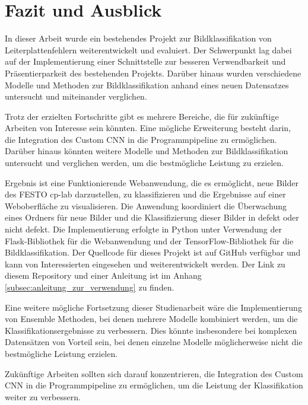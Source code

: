 
\chapter{Fazit und Ausblick} \label{chap:fazit_und_ausblick}

In dieser Arbeit wurde ein bestehendes Projekt zur Bildklassifikation von Leiterplattenfehlern weiterentwickelt und evaluiert. Der Schwerpunkt lag dabei auf der Implementierung einer Schnittstelle zur besseren Verwendbarkeit und Präsentierparkeit des bestehenden Projekts. Darüber hinaus wurden verschiedene Modelle und Methoden zur Bildklassifikation anhand eines neuen Datensatzes untersucht und miteinander verglichen.

Trotz der erzielten Fortschritte gibt es mehrere Bereiche, die für zukünftige Arbeiten von Interesse sein könnten. Eine mögliche Erweiterung besteht darin, die Integration des Custom CNN in die Programmpipeline zu ermöglichen. Darüber hinaus könnten weitere Modelle und Methoden zur Bildklassifikation untersucht und verglichen werden, um die bestmögliche Leistung zu erzielen.

Ergebnis ist eine Funktionierende Webanwendung, die es ermöglicht, neue Bilder des FESTO \ac{cp-lab} darzustellen, zu klassifizieren und die Ergebnisse auf einer Weboberfläche zu visualisieren. Die Anwendung koordiniert die Überwachung eines Ordners für neue Bilder und die Klassifizierung dieser Bilder in defekt oder nicht defekt. Die Implementierung erfolgte in Python unter Verwendung der Flask-Bibliothek für die Webanwendung und der TensorFlow-Bibliothek für die Bildklassifikation. Der Quellcode für dieses Projekt ist auf GitHub verfügbar und kann von Interessierten eingesehen und weiterentwickelt werden. Der Link zu diesem Repository und einer Anleitung ist im Anhang \autoref{subsec:anleitung_zur_verwendung} zu finden.

Eine weitere mögliche Fortsetzung dieser Studienarbeit wäre die Implementierung von Ensemble Methoden, bei denen mehrere Modelle kombiniert werden, um die Klassifikationsergebnisse zu verbessern. Dies könnte insbesondere bei komplexen Datensätzen von Vorteil sein, bei denen einzelne Modelle möglicherweise nicht die bestmögliche Leistung erzielen.

Zukünftige Arbeiten sollten sich darauf konzentrieren, die Integration des Custom CNN in die Programmpipeline zu ermöglichen, um die Leistung der Klassifikation weiter zu verbessern.